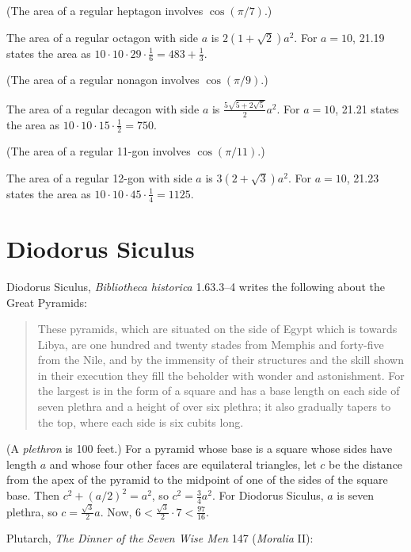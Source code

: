 \documentclass{article}
\theoremstyle{definition}
\begin{document}
(The area of a regular heptagon involves $\cos(\pi/7)$.)

The area of a regular octagon with side $a$ is $2(1+\sqrt{2})a^2$.
For $a=10$, 21.19 \cite[p.~385]{heronisIV} states the area as
$10 \cdot 10 \cdot 29 \cdot \frac{1}{6} = 483+\frac{1}{3}$. 

(The area of a regular nonagon involves $\cos(\pi/9)$.)

The area of a regular decagon with side $a$ is $\frac{5\sqrt{5+2\sqrt{5}}}{2} a^2$. 
For $a=10$, 21.21 states the area as $10\cdot 10 \cdot 15 \cdot \frac{1}{2}=750$. 

(The area of a regular 11-gon involves $\cos(\pi/11)$.)

The area of a regular 12-gon with side $a$ is $3(2+\sqrt{3})a^2$. For $a=10$, 21.23 \cite[p.~387]{heronisIV}
states the area as $10 \cdot 10 \cdot 45 \cdot \frac{1}{4}=1125$. 







\section{Diodorus Siculus}
Diodorus Siculus, {\em Bibliotheca historica} 1.63.3--4 writes the following about the Great Pyramids:

\begin{quote}
These pyramids, which are situated on the side of Egypt which is towards Libya, are one hundred and twenty stades from Memphis and forty-five from the Nile, and by the
immensity of their structures and the skill shown in their execution they fill the beholder with wonder and astonishment. For the largest is in the form of a square and has a base length on each side of seven plethra and a height of over six plethra; it also gradually tapers to the top, where each side is six cubits long.
\end{quote} 

(A {\em plethron} is 100 feet.)
For a pyramid whose base is a square whose sides have length $a$ and whose four other faces are equilateral triangles, let $c$ be the distance from the apex of the pyramid to the
midpoint of one of the sides of the square base. 
Then $c^2+(a/2)^2=a^2$, so $c^2=\frac{3}{4} a^2$. For Diodorus Siculus, $a$ is seven plethra, so $c= \frac{\sqrt{3}}{2} a$. Now, 
$6<\frac{\sqrt{3}}{2} \cdot 7<\frac{97}{16}$.

Plutarch, {\em The Dinner of the Seven Wise Men} 147 ({\em Moralia} II):
\end{document}
